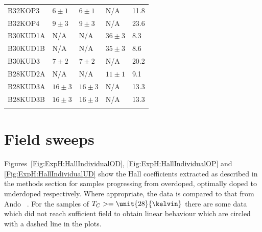 \begin{table}
\begin{center}
\begin{tabular}[htbp]{lllll}
B32KOP3 	& $6\pm1$ 	& $6\pm1$ 	& N/A		& 11.8	\\
B32KOP4 	& $9\pm3$ 	& $9\pm3$ 	& N/A		& 23.6	\\
B30KUD1A	& N/A		& N/A		& $36\pm3$ 	& 8.3	\\
B30KUD1B	& N/A		& N/A		& $35\pm3$ 	& 8.6	\\
\cellcolor[gray]{0.9}B30KUD3 	& \cellcolor[gray]{0.9}$7\pm2$ 	& \cellcolor[gray]{0.9}$7\pm2$ 	& \cellcolor[gray]{0.9}N/A		& \cellcolor[gray]{0.9}20.2	\\
B28KUD2A	& N/A		& N/A		& $11\pm1$ 	& 9.1	\\
\cellcolor[gray]{0.9}B28KUD3A	& \cellcolor[gray]{0.9}$16\pm3$	& \cellcolor[gray]{0.9}$16\pm3$	& \cellcolor[gray]{0.9}N/A		& \cellcolor[gray]{0.9}13.3	\\
B28KUD3B	& $16\pm3$	& $16\pm3$	& N/A		& 13.3	\\
\bottomrule
        \label{Table:ExpH:Thicknesses}
        \end{tabular}
    \end{center}
\end{table}

\section{Field sweeps}

Figures~\ref{Fig:ExpH:HallIndividualOD}, \ref{Fig:ExpH:HallIndividualOP} and \ref{Fig:ExpH:HallIndividualUD} show the Hall coefficients extracted as described in the methods section for samples progressing from overdoped, optimally doped to underdoped respectively. Where appropriate, the data is compared to that from Ando \etal~\cite{Ando1999}. For the samples of $T_C >= \unit{28}{\kelvin}$ there are some data which did not reach sufficient field to obtain linear behaviour which are circled with a dashed line in the plots.

